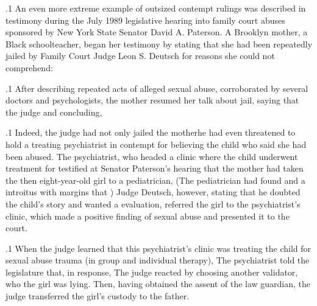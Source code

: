 \documentclass[11pt, twoside]{article}
\begin{document}
{\p.1{%
An even more extreme example of outsized contempt rulings was described in testimony during the July 1989 legislative hearing into family
court abuses sponsored by New York State Senator David A. Paterson.
A Brooklyn mother, a Black schoolteacher, began her testimony by stating that she had been repeatedly jailed by Family Court Judge Leon
S. Deutsch for reasons she could not comprehend: 
}%

\p.1{%
After describing repeated acts of alleged sexual abuse, corroborated
by several doctors and psychologists, the mother resumed her talk about
jail, saying that the judge  and concluding, 
}%

\p.1{%
Indeed, the judge had not only jailed the mother\mdash{}he had even threatened to hold a treating psychiatrist in contempt for believing the child
who said she had been abused. The psychiatrist, who headed a clinic
where the child underwent treatment for  testified
at Senator Paterson’s hearing that the mother had taken the
then eight-year-old girl to a pediatrician,  (The pediatrician had found  and a  introitus with margins that
) Judge Deutsch, however, stating that he
doubted the child’s story and wanted a  evaluation, referred the
girl to the psychiatrist’s clinic, which made a positive finding of sexual
abuse and presented it to the court.
}%

\p.1{%
When the judge learned that this psychiatrist’s clinic was treating the
child for sexual abuse trauma (in group and individual therapy),  The psychiatrist
told the legislature that, in response,  The judge reacted by choosing another
validator, who  the girl was lying. Then, having obtained the
assent of the law guardian, the judge transferred the girl’s custody to
the father.
}%

}
\end{document}
